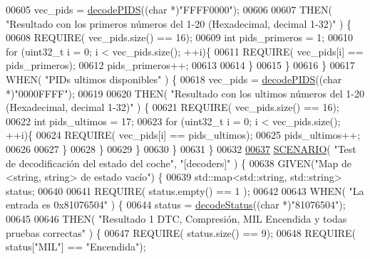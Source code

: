 \begin{DoxyCode}
{00605             vec\_pids = \hyperlink{decoders_8cpp_aef44cca306ed9c74b146d2b7dd058763}{decodePIDS}((\textcolor{keywordtype}{char} *)\textcolor{stringliteral}{"FFFF0000"});
00606 
00607             THEN( \textcolor{stringliteral}{"Resultado con los primeros números del 1-20 (Hexadecimal, decimal 1-32)"} ) \{
00608                 REQUIRE( vec\_pids.size() == 16);
00609                 \textcolor{keywordtype}{int} pids\_primeros = 1;
00610                 \textcolor{keywordflow}{for} (uint32\_t i = 0; i < vec\_pids.size(); ++i)\{
00611                     REQUIRE( vec\_pids[i] == pids\_primeros);
00612                     pids\_primeros++;
00613 
00614                 \}
00615             \}
00616         \}
00617         WHEN( \textcolor{stringliteral}{"PIDs ultimos disponibles"} ) \{
00618             vec\_pids = \hyperlink{decoders_8cpp_aef44cca306ed9c74b146d2b7dd058763}{decodePIDS}((\textcolor{keywordtype}{char} *)\textcolor{stringliteral}{"0000FFFF"});
00619 
00620             THEN( \textcolor{stringliteral}{"Resultado con los ultimos números del 1-20 (Hexadecimal, decimal 1-32)"} ) \{
00621                 REQUIRE( vec\_pids.size() == 16);
00622                 \textcolor{keywordtype}{int} pids\_ultimos = 17;
00623                 \textcolor{keywordflow}{for} (uint32\_t i = 0; i < vec\_pids.size(); ++i)\{
00624                     REQUIRE( vec\_pids[i] == pids\_ultimos);
00625                     pids\_ultimos++;
00626 
00627                 \}
00628             \}
00629         \}
00630     \}
00631 \}
00632 
\hyperlink{UnitTestCase_8cpp_a856763231cf6f39f98e63e778fa453b1}{00637} \hyperlink{UnitTestCase_8cpp_aa6afb62ebdd4c3e07996c995f623eb6b}{SCENARIO}( \textcolor{stringliteral}{"Test de decodificación del estado del coche"}, \textcolor{stringliteral}{"[decoders]"} ) \{
00638     GIVEN(\textcolor{stringliteral}{"Map de <string, string> de estado vacío"}) \{
00639         std::map<std::string, std::string> status;
00640 
00641         REQUIRE( status.empty() == 1 );
00642 
00643         WHEN( \textcolor{stringliteral}{"La entrada es 0x81076504"} ) \{
00644             status = \hyperlink{decoders_8cpp_aca9cad863d8603615597a0291804c8ae}{decodeStatus}((\textcolor{keywordtype}{char} *)\textcolor{stringliteral}{"81076504"});
00645 
00646             THEN( \textcolor{stringliteral}{"Resultado 1 DTC, Compresión, MIL Encendida y todas pruebas correctas"} ) \{
00647                 REQUIRE( status.size() == 9);
00648                 REQUIRE( status[\textcolor{stringliteral}{"MIL"}] == \textcolor{stringliteral}{"Encendida"});
}
\end{DoxyCode}
